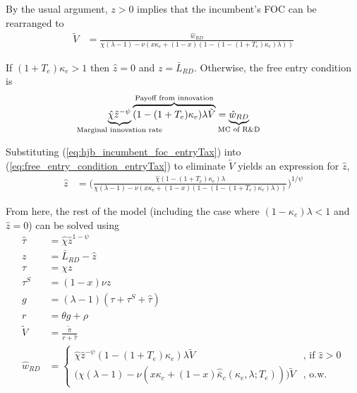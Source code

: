 \documentclass[11pt,english]{article}
\theoremstyle{remark}
\begin{document}
By the usual argument, $z > 0$ implies that the incumbent's FOC can be rearranged to
\begin{align}
\tilde{V} &= \frac{\hat{w}_{RD}}{\chi(\lambda -1) - \nu (x\kappa_c + (1-x)(1 - (1-(1+T_e)\kappa_e)\lambda)) } \label{eq:hjb_incumbent_foc_entryTax}
\end{align}

If $(1 + T_e) \kappa_e > 1$ then $\hat{z} = 0$ and $z = \bar{L}_{RD}$. Otherwise, the free entry condition is
\begin{align}
\underbrace{\hat{\chi} \hat{z}^{-\psi}}_{\mathclap{\text{Marginal innovation rate}}} \overbrace{(1-(1+T_e)\kappa_e) \lambda \tilde{V}}^{\mathclap{\text{Payoff from innovation}}} &= \underbrace{\hat{w}_{RD}}_{\mathclap{\text{MC of R\&D}}} \label{eq:free_entry_condition_entryTax}
\end{align}

Substituting (\ref{eq:hjb_incumbent_foc_entryTax}) into (\ref{eq:free_entry_condition_entryTax}) to eliminate $\tilde{V}$ yields an expression for $\hat{z}$, 
\begin{align}
\hat{z} &= \Bigg( \frac{\hat{\chi} (1-(1+T_e)\kappa_{e}) \lambda}{\chi(\lambda -1) - \nu (x\kappa_c + (1-x)(1 - (1-(1+T_e)\kappa_e)\lambda)) } \Bigg)^{1/\psi} \label{eq:effort_entrant_entryTax}
\end{align}

From here, the rest of the model (including the case where $(1-\kappa_e)\lambda < 1$ and $\hat{z} = 0$) can be solved using
\begin{align}
\hat{\tau} &= \hat{\chi} \hat{z}^{1-\psi} \\
z &= \bar{L}_{RD} - \hat{z} \label{eq:labor_resource_constraint_entryTax}\\ 
\tau &= \chi z \\
\tau^S &= (1-x) \nu z \\
g &= (\lambda - 1) (\tau + \tau^S + \hat{\tau}) \\
r &= \theta g + \rho \\
\tilde{V} &= \frac{\tilde{\pi}}{r + \hat{\tau}} \\ 
\hat{w}_{RD} &= \begin{cases}
				\hat{\chi} \hat{z}^{-\psi} (1-(1+T_e)\kappa_e) \lambda \tilde{V} &\textrm{, if } \hat{z} > 0\\
				\Big( \chi(\lambda -1) - \nu (x\kappa_c + (1-x)\hat{\bar{\kappa}}_c(\kappa_e,\lambda;T_e))\Big) \tilde{V} &\textrm{, o.w.}
			\end{cases} \label{eq:wage_rd_labor_entryTax}
\end{align}
\end{document}
